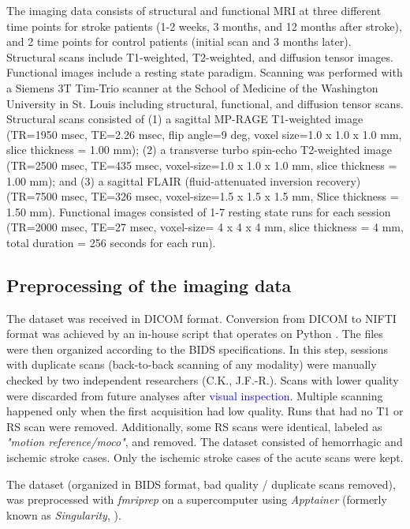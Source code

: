\documentclass[fleqn,10pt]{wlscirep}
\begin{document}
The imaging data consists of structural and functional MRI at three different time points for stroke patients (1-2 weeks, 3 months, and 12 months after stroke), and 2 time points for control patients (initial scan and 3 months later). Structural scans include T1-weighted, T2-weighted, and diffusion tensor images. Functional images include a resting state paradigm. Scanning was performed with a Siemens 3T Tim-Trio scanner at the School of Medicine of the Washington University in St. Louis including structural, functional, and diffusion tensor scans. Structural scans consisted of (1) a sagittal MP-RAGE T1-weighted image (TR=1950 msec, TE=2.26 msec, flip angle=9 deg, voxel size=1.0 x 1.0 x 1.0 mm, slice thickness = 1.00 mm); (2) a transverse turbo spin-echo T2-weighted image (TR=2500 msec, TE=435 msec, voxel-size=1.0 x 1.0 x 1.0 mm, slice thickness = 1.00 mm); and (3) a sagittal FLAIR (fluid-attenuated inversion recovery) (TR=7500 msec, TE=326 msec, voxel-size=1.5 x 1.5 x 1.5 mm, Slice thickness = 1.50 mm). Functional images consisted of 1-7 resting state runs for each session (TR=2000 msec, TE=27 msec, voxel-size= 4 x 4 x 4 mm, slice thickness = 4 mm, total duration = 256 seconds for each run). 

\subsection*{Preprocessing of the imaging data}
The dataset was received in DICOM format. Conversion from DICOM to NIFTI format was achieved by an in-house script that operates on Python \citep{rogetgithub}. The files were then organized according to the BIDS specifications. In this step, sessions with duplicate scans (back-to-back scanning of any modality) were manually checked by two independent researchers (C.K., J.F.-R.). Scans with lower quality were discarded from future analyses after \textcolor{blue}{visual inspection}. Multiple scanning happened only when the first acquisition had low quality. Runs that had no T1 or RS scan were removed. Additionally, some RS scans were identical, labeled as \textit{"motion reference/moco"}, and removed. The dataset consisted of hemorrhagic and ischemic stroke cases. Only the ischemic stroke cases of the acute scans were kept. 

The dataset (organized in BIDS format, bad quality / duplicate scans removed), was preprocessed with \emph{fmriprep} \citep{fmriprep1} on a supercomputer using \emph{Apptainer} (formerly known as \emph{Singularity}, \cite{kurtzer2017singularity}).  
\end{document}
